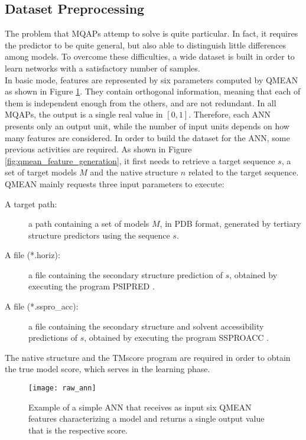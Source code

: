 \subsection{Dataset Preprocessing}
\label{subsec:dataset_preprocessing}
The problem that MQAPs attemp to solve is quite particular. In fact, it requires the predictor to be quite general, but also able to distinguish little differences among models. To overcome these difficulties, a wide dataset is built in order to learn networks with a satisfactory number of samples.\\
In basic mode, features are represented by six parameters computed by QMEAN as shown in Figure \ref{fig:raw_ann}. They contain orthogonal information, meaning that each of them is independent enough from the others, and are not redundant. In all MQAPs, the output is a single real value in $[0, 1]$. Therefore, each ANN presents only an output unit, while the number of input units depends on how many features are considered. In order to build the dataset for the ANN, some previous activities are required. As shown in Figure \ref{fig:qmean_feature_generation}, it first needs to retrieve a target sequence $s$, a set of target models $M$ and the native structure $n$ related to the target sequence. QMEAN mainly requests three input parameters to execute:
\begin{description}
 \item [A target path:] a path containing a set of models $M$, in \gls{PDB} format, generated by tertiary structure predictors using the sequence $s$.
 \item [A file (*.horiz):] a file containing the secondary structure prediction of $s$, obtained by executing the program PSIPRED \cite{Jones1999aa}.
 \item [A file (*.sspro\_acc):] a file containing the secondary structure and solvent accessibility predictions of $s$, obtained by executing the program SSPROACC \cite{Pollastri2007aa, Schuster1997aa}.
\end{description}
The native structure and the TMscore program \cite{Zhang2004} are required in order to obtain the true model score, which serves in the learning phase.
\begin{figure}[tb]
	\begin{center}
		\texttt{[image: raw\_ann]}
		\caption[Artificial neural network of six features from QMEAN]{Example of a simple ANN that receives as input six QMEAN features characterizing a model and returns a single output value that is the respective score.}
		\label{fig:raw_ann}
	\end{center}
\end{figure}
